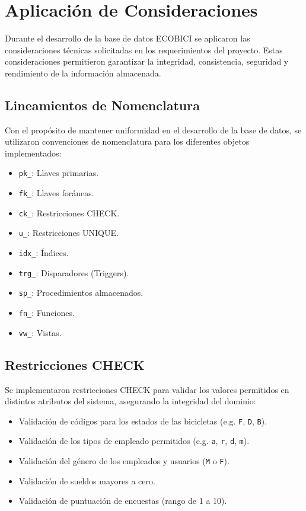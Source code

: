 \section{Aplicación de Consideraciones}

Durante el desarrollo de la base de datos ECOBICI se aplicaron las consideraciones técnicas solicitadas en los requerimientos del proyecto. Estas consideraciones permitieron garantizar la integridad, consistencia, seguridad y rendimiento de la información almacenada.

\subsection{Lineamientos de Nomenclatura}

Con el propósito de mantener uniformidad en el desarrollo de la base de datos, se utilizaron convenciones de nomenclatura para los diferentes objetos implementados:
\begin{itemize}
	\item \texttt{pk\_}: Llaves primarias.
	\item \texttt{fk\_}: Llaves foráneas.
	\item \texttt{ck\_}: Restricciones CHECK.
	\item \texttt{u\_}: Restricciones UNIQUE.
	\item \texttt{idx\_}: Índices.
	\item \texttt{trg\_}: Disparadores (Triggers).
	\item \texttt{sp\_}: Procedimientos almacenados.
	\item \texttt{fn\_}: Funciones.
	\item \texttt{vw\_}: Vistas.
\end{itemize}

\subsection{Restricciones CHECK}

Se implementaron restricciones CHECK para validar los valores permitidos en distintos atributos del sistema, asegurando la integridad del dominio:
\begin{itemize}
	\item Validación de códigos para los estados de las bicicletas (e.g. \texttt{F}, \texttt{D}, \texttt{B}).
	\item Validación de los tipos de empleado permitidos (e.g. \texttt{a}, \texttt{r}, \texttt{d}, \texttt{m}).
	\item Validación del género de los empleados y usuarios (\texttt{M} o \texttt{F}).
	\item Validación de sueldos mayores a cero.
	\item Validación de puntuación de encuestas (rango de 1 a 10).
\end{itemize}

